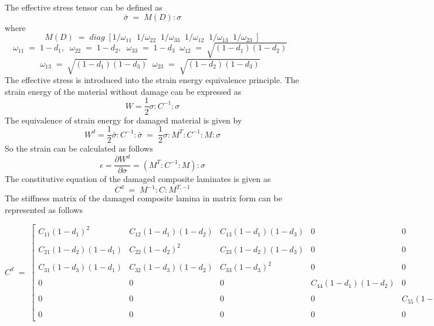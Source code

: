 The effective stress tensor can be defined as 
\begin{equation}
   \bar{\sigma} \; = \; M(D) : \sigma
\end{equation}  
where
\begin{equation*}
M(D) \; = \; diag\;[1/\omega_{11}\;\;1/\omega_{22}\;\;1/\omega_{33}\;\;1/\omega_{12}\;\;1/\omega_{13}\;\;1/\omega_{23}\;]
\end{equation*}
\begin{equation*}
\omega_{11}\; = \; 1 - d_{1}, \;\; \omega_{22}\; = \; 1 - d_{2}, \;\;\omega_{33}\; = \; 1 - d_{3} \;\; \omega_{12}\; = \; \sqrt{(1 - d_{1})(1 - d_{2})} \;\;
\end{equation*}
\begin{equation*}
 \omega_{13}\; = \; \sqrt{(1 - d_{1})(1 - d_{3})} \;\;  \omega_{23}\; = \; \sqrt{(1 - d_{2})(1 - d_{3})} \;\;
\end{equation*}
The effective stress is introduced into the strain energy equivalence principle. The strain energy of the material without damage can be expressed as 
\begin{equation}
W = \frac{1}{2}\sigma:C^{-1}:\sigma
\end{equation}
The equivalence of strain energy for damaged material is given by
\begin{equation}
W^{d} = \frac{1}{2}\bar{\sigma}:C^{-1}:\bar{\sigma} \; = \; \frac{1}{2}\sigma: M^{T}:C^{-1}:M:\sigma
\end{equation}
So the strain can be calculated as follows
\begin{equation}
\epsilon = \frac{\partial W^{d}}{\partial \sigma} = (M^{T}:C^{-1}:M):\sigma
\end{equation}
The constitutive equation of the damaged composite laminates is given as 
\begin{equation}
C^{d}\; = \; M^{-1}:C:M^{T,-1}
\end{equation}
\newpage
The stiffness matrix of the damaged composite lamina in matrix form can be represented as follows
\begin{tiny}
\begin{equation*}
C^{d} \; = \; 
 \begin{bmatrix}
  C_{11}(1 - d_{1})^{2} & C_{12}(1 - d_{1})(1 - d_{2}) & C_{13}(1 - d_{1})(1 - d_{3})  & 0 & 0 & 0 \\
  \\
  C_{21}(1 - d_{2})(1 - d_{1}) & C_{22}(1 - d_{2})^{2}  & C_{23}(1 - d_{2})(1 - d_{3}) & 0 & 0 & 0 \\
 \\  
  C_{31}(1 - d_{3})(1 - d_{1}) & C_{32}(1 - d_{3})(1 - d_{2}) & C_{33}(1 - d_{3})^{2}  & 0 & 0 & 0 \\
  \\
  0 & 0 & 0 & C_{44}(1 - d_{1})(1 - d_{2})   & 0 & 0 \\
  \\
  0 & 0 & 0 & 0 & C_{55}(1 - d_{1})(1 - d_{3}) & 0 \\
  \\
  0& 0 & 0 & 0 & 0 & C_{66}(1 - d_{2})(1 - d_{3}) 
 \end{bmatrix}
\end{equation*}
\end{tiny}
